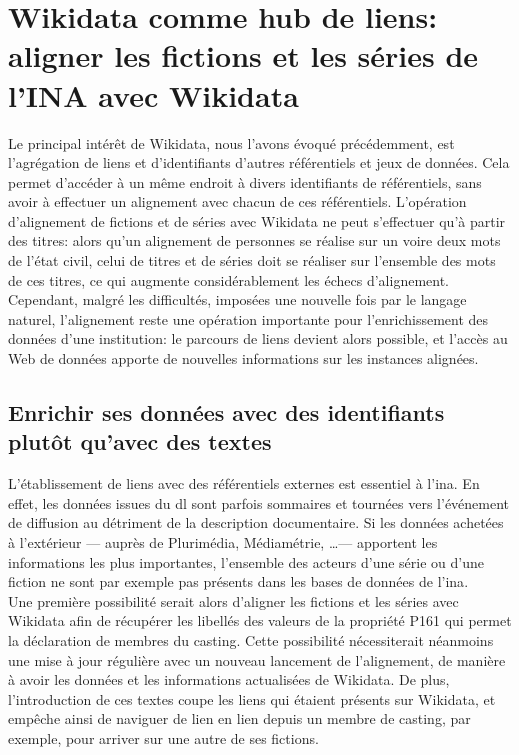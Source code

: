 \section{\label{III-A-3}Wikidata comme hub de liens: aligner les fictions et les séries de l'INA avec Wikidata}

Le principal intérêt de Wikidata, nous l'avons évoqué précédemment, est l'agrégation de liens et d'identifiants d'autres référentiels et jeux de données. Cela permet d'accéder à un même endroit à divers identifiants de référentiels, sans avoir à effectuer un alignement avec chacun de ces référentiels. L'opération d'alignement de fictions et de séries avec Wikidata ne peut s'effectuer qu'à partir des titres: alors qu'un alignement de personnes se réalise sur un voire deux mots de l'état civil, celui de titres et de séries doit se réaliser sur l'ensemble des mots de ces titres, ce qui augmente considérablement les échecs d'alignement.\\

Cependant, malgré les difficultés, imposées une nouvelle fois par le langage naturel, l'alignement reste une opération importante pour l'enrichissement des données d'une institution: le parcours de liens devient alors possible, et l'accès au Web de données apporte de nouvelles informations sur les instances alignées.

\subsection{\label{III-A-3-a}Enrichir ses données avec des identifiants plutôt qu'avec des textes}

L'établissement de liens avec des référentiels externes est essentiel à l'\ac{ina}. En effet, les données issues du \ac{dl} sont parfois sommaires et tournées vers l'événement de diffusion au détriment de la description documentaire. Si les données achetées à l'extérieur --- auprès de Plurimédia, Médiamétrie, \dots --- apportent les informations les plus importantes, l'ensemble des acteurs d'une série ou d'une fiction ne sont par exemple pas présents dans les bases de données de l'\ac{ina}.\\

Une première possibilité serait alors d'aligner les fictions et les séries avec Wikidata afin de récupérer les libellés des valeurs de la propriété P161 qui permet la déclaration de membres du casting. Cette possibilité nécessiterait néanmoins une mise à jour régulière avec un nouveau lancement de l'alignement, de manière à avoir les données et les informations actualisées de Wikidata. De plus, l'introduction de ces textes coupe les liens qui étaient présents sur Wikidata, et empêche ainsi de naviguer de lien en lien depuis un membre de casting, par exemple, pour arriver sur une autre de ses fictions.\\

